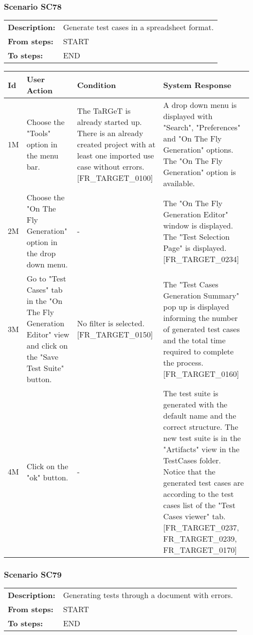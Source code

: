 \documentclass[a4paper,11pt]{article}
\newcommand{\bl}{\\ \hline}
\begin{document}
\subsubsection*{Scenario SC78}
\begin{tabular}{p{1in}p{4in}}
{\bf Description:} & Generate test cases in a spreadsheet format.
				 \\
{\bf From steps:} & START \\
{\bf To steps:} & END \\
\end{tabular}
 
\begin{tabular}{|p{0.8in}|p{1.6in}|p{1.6in}|p{1.6in}|}
\hline
Id & User Action & Condition & System Response  \bl 
1M & Choose the "Tools" option in the menu bar.  & The TaRGeT is already started up. There is an already
						created project with at least one imported use case without
						errors. [FR_TARGET_0100] & A drop down menu is displayed with "Search",
						"Preferences" and "On The Fly Generation" options. The "On The Fly
						Generation" option is available.  \bl 
2M & Choose the "On The Fly Generation" option in the drop down
						menu. & - & The "On The Fly Generation Editor" window is displayed.
						The "Test Selection Page" is displayed. [FR_TARGET_0234]
					 \bl 
3M & Go to "Test Cases" tab in the "On The Fly Generation
						Editor" view and click on the "Save Test Suite" button. & No filter is selected. [FR_TARGET_0150] & The "Test Cases Generation Summary" pop up is displayed
						informing the number of generated test cases and the total time
						required to complete the process. [FR_TARGET_0160] \bl 
4M & Click on the "ok" button. & - & The test suite is generated with the default name and the
						correct structure. The new test suite is in the "Artifacts" view
						in the TestCases folder. Notice that the generated test cases are
						according to the test cases list of the "Test Cases viewer" tab.
						[FR_TARGET_0237, FR_TARGET_0239, FR_TARGET_0170] \bl 
\end{tabular}
\subsubsection*{Scenario SC79}
\begin{tabular}{p{1in}p{4in}}
{\bf Description:} & Generating tests through a document with errors.
				 \\
{\bf From steps:} & START \\
{\bf To steps:} & END \\
\end{tabular}
 
\end{document}
